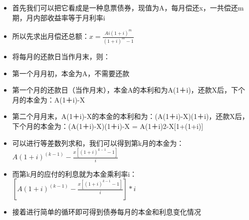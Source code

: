 \documentclass[11pt]{article}
\providecommand{\tightlist}{%
      \setlength{\itemsep}{0pt}\setlength{\parskip}{0pt}}
\begin{document}
\begin{itemize}
\tightlist
\item
  首先我们可以把它看成是一种息票债券，现值为A，每月偿还x，一共偿还m期，月内部收益率等于月利率i
\item
  所以先求出月偿还总额：$x = \frac{Ai(1+i)^m}{(1+i)^m-1} $
\item
  将每月的还款日当作月末，则：
\item
  第一个月月初，本金为A，不需要还款
\item
  第一个月的还款日（当作月末），本金A的本利和为A(1＋i)，还款X后，下个月的本金为：A(1＋i)-X
\item
  第二个月月末，A(1＋i)-X的本金的本利和为：(A(1＋i)-X)(1＋i)，还款X后，下个月的本金为：(A(1＋i)-X)(1＋i)-X
  = A(1＋i)2-X{[}1+(1+i){]}
\item
  可以进行等差数列求和，我们可以得到第k月的本金为：\(A(1+i)^{(k-1)}-\frac{x[(1+i)^{k-1}-1]}{i}\)
\item
  而第k月的应付的利息就为本金乘利率i：\([A(1+i)^{(k-1)}-\frac{x[(1+i)^{k-1}-1]}{i}]*i\)
\item
  接着进行简单的循环即可得到债券每月的本金和利息变化情况
\end{itemize}
\end{document}

